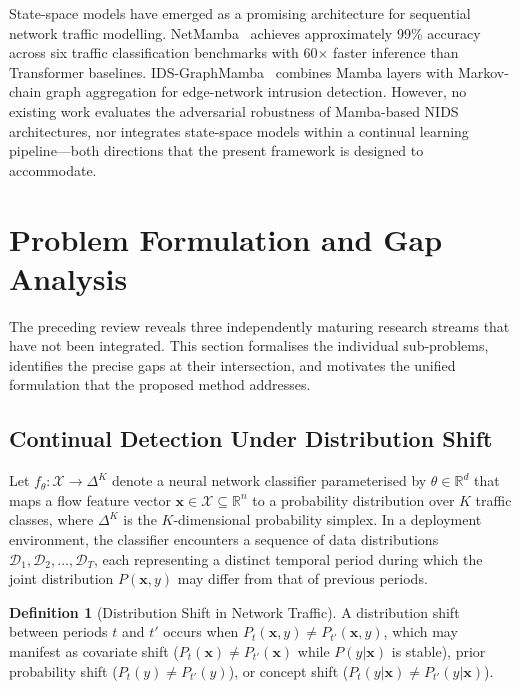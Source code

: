 \documentclass[journal]{IEEEtran}
\theoremstyle{definition}
\newtheorem{definition}{Definition}
\theoremstyle{remark}
\newcommand{\real}{\mathbb{R}}
\begin{document}
State-space models have emerged as a promising architecture for sequential network traffic modelling. NetMamba~\cite{wang2024netmamba} achieves approximately 99\% accuracy across six traffic classification benchmarks with 60$\times$ faster inference than Transformer baselines. IDS-GraphMamba~\cite{idsgraphmamba2025} combines Mamba layers with Markov-chain graph aggregation for edge-network intrusion detection. However, no existing work evaluates the adversarial robustness of Mamba-based NIDS architectures, nor integrates state-space models within a continual learning pipeline---both directions that the present framework is designed to accommodate.

\section{Problem Formulation and Gap Analysis}
\label{sec:problem}

The preceding review reveals three independently maturing research streams that have not been integrated. This section formalises the individual sub-problems, identifies the precise gaps at their intersection, and motivates the unified formulation that the proposed method addresses.

\subsection{Continual Detection Under Distribution Shift}
\label{subsec:prob_cl}

Let $f_\theta : \mathcal{X} \to \Delta^{K}$ denote a neural network classifier parameterised by $\theta \in \real^d$ that maps a flow feature vector $\mathbf{x} \in \mathcal{X} \subseteq \real^n$ to a probability distribution over $K$ traffic classes, where $\Delta^K$ is the $K$-dimensional probability simplex. In a deployment environment, the classifier encounters a sequence of data distributions $\mathcal{D}_1, \mathcal{D}_2, \ldots, \mathcal{D}_T$, each representing a distinct temporal period during which the joint distribution $P(\mathbf{x}, y)$ may differ from that of previous periods.

\begin{definition}[Distribution Shift in Network Traffic]
\label{def:drift}
A distribution shift between periods $t$ and $t'$ occurs when $P_t(\mathbf{x}, y) \neq P_{t'}(\mathbf{x}, y)$, which may manifest as covariate shift ($P_t(\mathbf{x}) \neq P_{t'}(\mathbf{x})$ while $P(y|\mathbf{x})$ is stable), prior probability shift ($P_t(y) \neq P_{t'}(y)$), or concept shift ($P_t(y|\mathbf{x}) \neq P_{t'}(y|\mathbf{x})$).
\end{definition}
\end{document}
